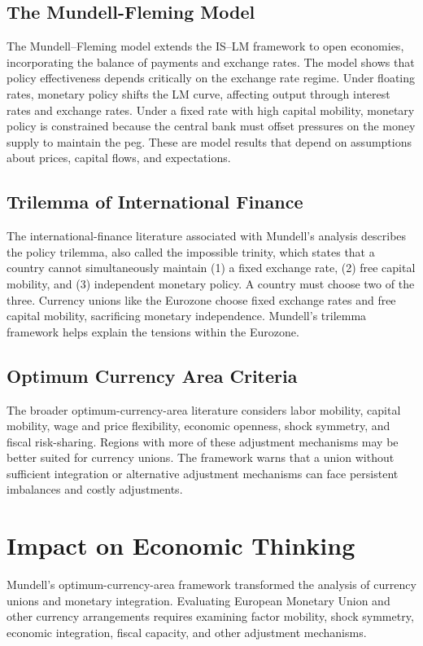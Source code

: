\subsection*{The Mundell-Fleming Model}
The Mundell--Fleming model extends the IS--LM framework to open economies,
incorporating the balance of payments and exchange rates. The model shows that
policy effectiveness depends critically on the exchange rate regime. Under floating
rates, monetary policy shifts the LM curve, affecting output through interest
rates and exchange rates. Under a fixed rate with high capital mobility, monetary
policy is constrained because the central bank must offset pressures on the money
supply to maintain the peg. These are model results that depend on assumptions
about prices, capital flows, and expectations.

\subsection*{Trilemma of International Finance}
The international-finance literature associated with Mundell's analysis describes
the policy trilemma, also called the impossible trinity, which
states that a country cannot simultaneously maintain (1) a fixed exchange rate,
(2) free capital mobility, and (3) independent monetary policy. A country must
choose two of the three. Currency unions like the Eurozone choose fixed exchange
rates and free capital mobility, sacrificing monetary independence. Mundell's
trilemma framework helps explain the tensions within the Eurozone.

\subsection*{Optimum Currency Area Criteria}
The broader optimum-currency-area literature considers labor mobility, capital
mobility, wage and price flexibility, economic openness, shock symmetry, and
fiscal risk-sharing. Regions with more of these adjustment mechanisms may be
better suited for currency unions. The framework warns that a union without
sufficient integration or alternative adjustment mechanisms can face persistent
imbalances and costly adjustments.

\section{Impact on Economic Thinking}
Mundell's optimum-currency-area framework transformed the analysis of currency
unions and monetary integration. Evaluating European Monetary Union and other
currency arrangements requires examining factor mobility, shock symmetry,
economic integration, fiscal capacity, and other adjustment mechanisms.

